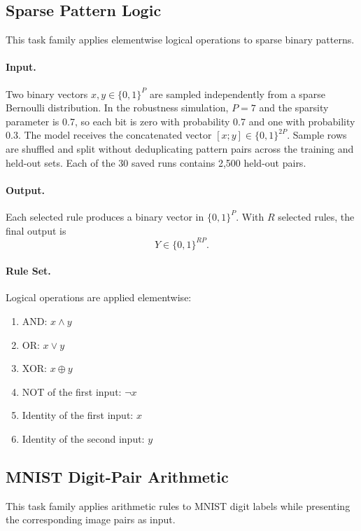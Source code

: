 \documentclass{article}
\begin{document}
\subsection{Sparse Pattern Logic}
\label{appendix:pattern_sequence}

This task family applies elementwise logical operations to sparse binary patterns.

\paragraph{Input.}
Two binary vectors $x,y\in\{0,1\}^{P}$ are sampled independently from a sparse Bernoulli distribution. In the robustness simulation, $P=7$ and the sparsity parameter is 0.7, so each bit is zero with probability 0.7 and one with probability 0.3. The model receives the concatenated vector $[x;y]\in\{0,1\}^{2P}$. Sample rows are shuffled and split without deduplicating pattern pairs across the training and held-out sets. Each of the 30 saved runs contains 2,500 held-out pairs.

\paragraph{Output.}
Each selected rule produces a binary vector in $\{0,1\}^{P}$. With $R$ selected rules, the final output is
\[
Y \in \{0,1\}^{RP}.
\]

\paragraph{Rule Set.}
Logical operations are applied elementwise:
\begin{enumerate}
    \item AND: $x\wedge y$
    \item OR: $x\vee y$
    \item XOR: $x\oplus y$
    \item NOT of the first input: $\neg x$
    \item Identity of the first input: $x$
    \item Identity of the second input: $y$
\end{enumerate}

\subsection{MNIST Digit-Pair Arithmetic}
\label{appendix:mnist_pairs}

This task family applies arithmetic rules to MNIST digit labels while presenting the corresponding image pairs as input.
\end{document}
